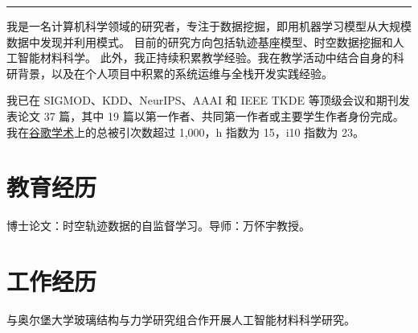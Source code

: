 {\color{rule}\rule{\linewidth}{0.4pt}}

\vspace{\entryskip}
我是一名计算机科学领域的研究者，专注于数据挖掘，即用机器学习模型从大规模数据中发现并利用模式。
目前的研究方向包括轨迹基座模型、时空数据挖掘和人工智能材料科学。
此外，我正持续积累教学经验。我在教学活动中结合自身的科研背景，以及在个人项目中积累的系统运维与全栈开发实践经验。

\vspace{\entryskip}
我已在 SIGMOD、KDD、NeurIPS、AAAI 和 IEEE TKDE 等顶级会议和期刊发表论文 37 篇，其中 19 篇以第一作者、共同第一作者或主要学生作者身份完成。
我在\href{https://scholar.google.com/citations?user=nHMmG2UAAAAJ}{谷歌学术}上的总被引次数超过 1,000，h 指数为 15，i10 指数为 23。


\section*{教育经历}

{博士论文：时空轨迹数据的自监督学习。导师：万怀宇教授。}




\section*{工作经历}

{}

{与奥尔堡大学玻璃结构与力学研究组合作开展人工智能材料科学研究。}

